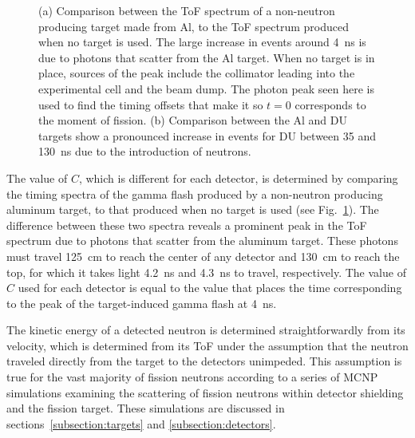 \begin{figure}[]
    \caption{(a) Comparison between the ToF spectrum of a non-neutron producing target made from Al, to the ToF spectrum produced when no target is used.
    The large increase in events around 4~ns is due to photons that scatter from the Al target.
    When no target is in place, sources of the peak include the collimator leading into the experimental cell and the beam dump.
    The photon peak seen here is used to find the timing offsets that make it so $t=0$ corresponds to the moment of fission.
    (b) Comparison between the Al and DU targets show a pronounced increase in events for DU between 35 and 130~ns due to the introduction of neutrons.}
    \label{fig:ToF}
\end{figure}

The value of $C$, which is different for each detector, is determined by comparing the timing spectra of the gamma flash produced by a non-neutron producing aluminum target, to that produced when no target is used (see Fig.~\ref{fig:ToF}).
The difference between these two spectra reveals a prominent peak in the ToF spectrum due to photons that scatter from the aluminum target.
These photons must travel 125~cm to reach the center of any detector and 130~cm to reach the top, for which it takes light 4.2~ns and 4.3~ns to travel, respectively.
The value of $C$ used for each detector is equal to the value that places the time corresponding to the peak of the target-induced gamma flash at 4~ns.

The kinetic energy of a detected neutron is determined straightforwardly from its velocity, which is determined from its ToF under the assumption that the neutron traveled directly from the target to the detectors unimpeded.
This assumption is true for the vast majority of fission neutrons according to a series of MCNP simulations examining the scattering of fission neutrons within detector shielding and the fission target.
These simulations are discussed in sections~\ref{subsection:targets} and \ref{subsection:detectors}.

